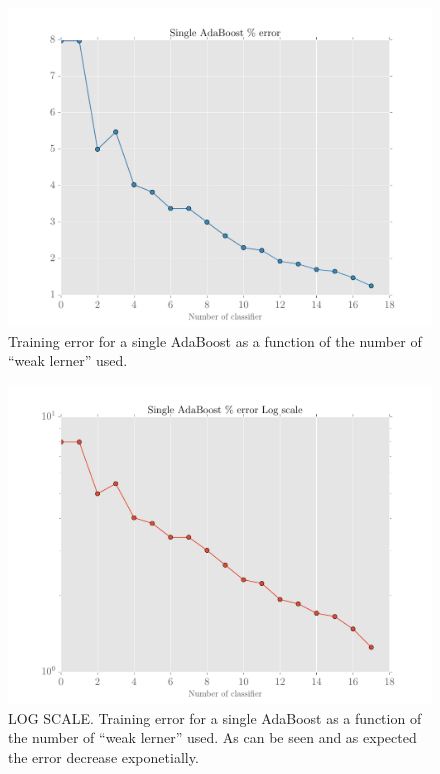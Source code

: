 \documentclass[11pt]{amsart}
\begin{document}
\begin{figure}[htbp]
\begin{center}
\includegraphics[scale=0.5]{single_ada.pdf}
\caption{Training error for a single AdaBoost as a function of the number of ``weak lerner'' used.}
\label{default}
\end{center}
\end{figure}

\begin{figure}[htbp]
\begin{center}
\includegraphics[scale=0.5]{single_ada_log.pdf}
\caption{LOG SCALE. Training error for a single AdaBoost as a function of the number of ``weak lerner'' used. As can be seen and as expected the error decrease exponetially.}
\label{default}
\end{center}
\end{figure}
\end{document}
